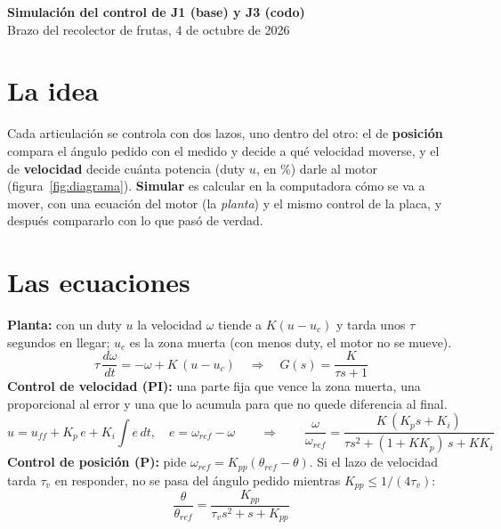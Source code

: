 \documentclass[10pt,a4paper]{article}
\begin{document}
\begin{center}
  {\Large\bfseries Simulación del control de J1 (base) y J3 (codo)}\\[2pt]
  {\small Brazo del recolector de frutas, 4 de octubre de 2026}
\end{center}

\section{La idea}
Cada articulación se controla con dos lazos, uno dentro del otro: el de \textbf{posición} compara el ángulo pedido con
el medido y decide a qué velocidad moverse, y el de \textbf{velocidad} decide cuánta potencia (duty $u$, en \%) darle
al motor (figura~\ref{fig:diagrama}). \textbf{Simular} es calcular en la computadora cómo se va a mover, con una
ecuación del motor (la \emph{planta}) y el mismo control de la placa, y después compararlo con lo que pasó de verdad.

\section{Las ecuaciones}
\textbf{Planta:} con un duty $u$ la velocidad $\omega$ tiende a $K(u-u_c)$ y tarda unos $\tau$ segundos en llegar;
$u_c$ es la zona muerta (con menos duty, el motor no se mueve).
\[
  \tau\,\frac{d\omega}{dt}=-\omega+K\,(u-u_c)\quad\Longrightarrow\quad G(s)=\frac{K}{\tau s+1}
\]
\textbf{Control de velocidad (PI):} una parte fija que vence la zona muerta, una proporcional al error y una que lo
acumula para que no quede diferencia al final.
\[
  u=u_{ff}+K_p\,e+K_i\!\int e\,dt,\quad e=\omega_{ref}-\omega
  \qquad\Longrightarrow\qquad
  \frac{\omega}{\omega_{ref}}=\frac{K\,(K_p s+K_i)}{\tau s^2+(1+K K_p)\,s+K K_i}
\]
\textbf{Control de posición (P):} pide $\omega_{ref}=K_{pp}(\theta_{ref}-\theta)$. Si el lazo de velocidad tarda
$\tau_v$ en responder, no se pasa del ángulo pedido mientras $K_{pp}\le 1/(4\tau_v)$:
\[
  \frac{\theta}{\theta_{ref}}=\frac{K_{pp}}{\tau_v s^2+s+K_{pp}}
\]
\end{document}
